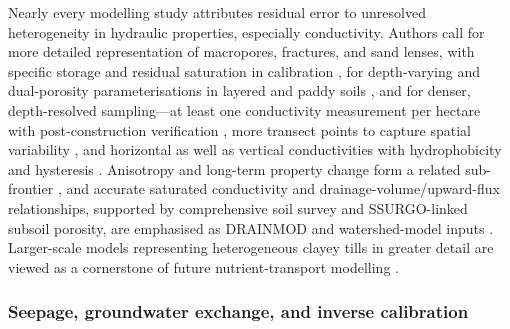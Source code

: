 \documentclass[11pt]{article}
\begin{document}
Nearly every modelling study attributes residual error to unresolved
heterogeneity in hydraulic properties, especially conductivity. Authors call for
more detailed representation of macropores, fractures, and sand lenses, with
specific storage and residual saturation in calibration
\parencite{DeSchepper2017}, for depth-varying and dual-porosity parameterisations
in layered and paddy soils \parencite{Wesström2003,Karandish2018}, and for
denser, depth-resolved sampling---at least one conductivity measurement per
hectare with post-construction verification \parencite{PalaciosVélez2004}, more
transect points to capture spatial variability \parencite{Messing2006}, and
horizontal as well as vertical conductivities with hydrophobicity and hysteresis
\parencite{Tähtikarhu2025}. Anisotropy and long-term property change form a
related sub-frontier \parencite{Akis2015,Moustafa1998,Koivusalo1999}, and
accurate saturated conductivity and drainage-volume/upward-flux relationships,
supported by comprehensive soil survey and SSURGO-linked subsoil porosity, are
emphasised as DRAINMOD and watershed-model inputs
\parencite{DeBoer2006,Schilling2015}. Larger-scale models representing
heterogeneous clayey tills in greater detail are viewed as a cornerstone of
future nutrient-transport modelling \parencite{DeSchepper2015}.

\subsubsection{Seepage, groundwater exchange, and inverse calibration}
\end{document}
